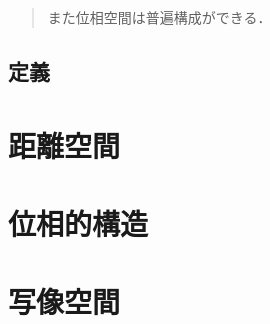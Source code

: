 \documentclass[uplatex,dvipdfmx]{jsreport}
\begin{document}
\begin{quotation}
    また位相空間は普遍構成ができる．
\end{quotation}

\section{定義}

\chapter{距離空間}

\begin{quotation}
    
\end{quotation}

\chapter{位相的構造}

\chapter{写像空間}
\end{document}
